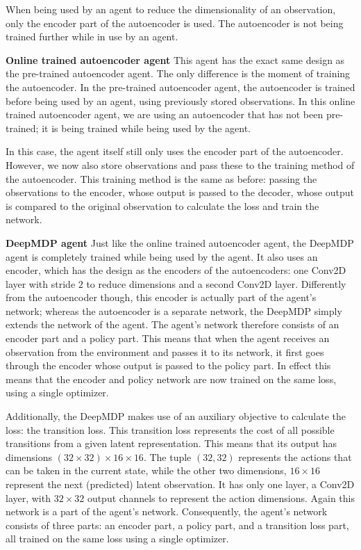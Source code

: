 When being used by an agent to reduce the dimensionality of an observation, only the encoder part of the autoencoder is used. The autoencoder is not being trained further while in use by an agent. \newline
 
\noindent \textbf{Online trained autoencoder agent}\newline
\noindent  This agent has the exact same design as the pre-trained autoencoder agent. The only difference is the moment of training the autoencoder. In the pre-trained autoencoder agent, the autoencoder is trained before being used by an agent, using previously stored observations. In this online trained autoencoder agent, we are using an autoencoder that has not been pre-trained; it is being trained while being used by the agent. 

In this case, the agent itself still only uses the encoder part of the autoencoder. However, we now also store observations and pass these to the training method of the autoencoder. This training method is the same as before: passing the observations to the encoder, whose output is passed to the decoder, whose output is compared to the original observation to calculate the loss and train the network.\newline

\noindent \textbf{DeepMDP agent}\newline
\noindent Just like the online trained autoencoder agent, the DeepMDP agent is completely trained while being used by the agent. It also uses an encoder, which has the design as the encoders of the autoencoders: one Conv2D layer with stride $2$ to reduce dimensions and a second Conv2D layer. Differently from the autoencoder though, this encoder is actually part of the agent's network; whereas the autoencoder is a separate network, the DeepMDP simply extends the network of the agent. The agent's network therefore consists of an encoder part and a policy part. This means that when the agent receives an observation from the environment and passes it to its network, it first goes through the encoder whose output is passed to the policy part. In effect this means that the encoder and policy network are now trained on the same loss, using a single optimizer.

Additionally, the DeepMDP makes use of an auxiliary objective to calculate the loss: the transition loss. This transition loss represents the cost of all possible transitions from a given latent representation. This means that its output has dimensions $(32 \times 32) \times 16 \times 16$. The tuple $(32, 32)$ represents the actions that can be taken in the current state, while the other two dimensions, $16 \times 16$ represent the next (predicted) latent observation. It has only one layer, a Conv2D layer, with $32 \times 32$ output channels to represent the action dimensions. Again this network is a part of the agent's network. Consequently, the agent's network consists of three parts: an encoder part, a policy part, and a transition loss part, all trained on the same loss using a single optimizer.

